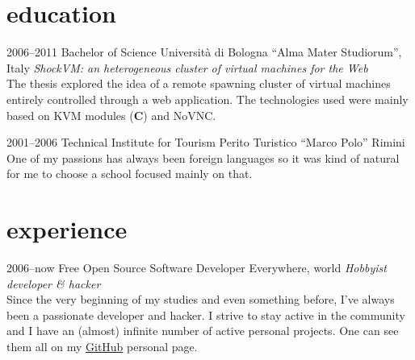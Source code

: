 \documentclass[]{friggeri-cv}
\begin{document}

\section{education}

\begin{entrylist}
  \entry
      {2006--2011}
      {Bachelor of Science}
      {Universit\`a di Bologna ``Alma Mater Studiorum'', Italy}
      {\emph{ShockVM: an heterogeneous cluster of virtual machines for the Web}
        \\
        The thesis explored the idea of a remote spawning cluster of virtual
        machines entirely controlled through a web application. The technologies
        used were mainly based on KVM modules (\textbf{C}) and NoVNC.}
\end{entrylist}

\begin{entrylist}
    \entry
      {2001--2006}
      {Technical Institute for Tourism}
      {Perito Turistico ``Marco Polo'' Rimini}
      {One of my passions has always been foreign languages so it was kind of
      natural for me to choose a school focused mainly on that.}
\end{entrylist}


\section{experience}

\begin{entrylist}
  \entry
      {2006--now}
      {Free Open Source Software Developer}
      {Everywhere, world}
      {\emph{Hobbyist developer \& hacker} \\
        Since the very beginning of my studies and even something before, I've
        always been a passionate developer and hacker.  I strive to stay active
        in the community and I have an (almost) infinite number of active personal
        projects.  One can see them all on my \href{https://github.com/massix/}{GitHub}
        personal page.
      }
\end{entrylist}
\end{document}
